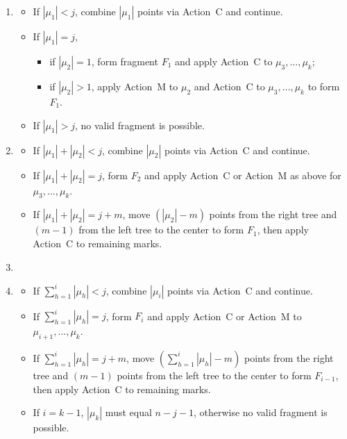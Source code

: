 \documentclass[11pt,reqno]{amsart}
\theoremstyle{definition}
\begin{document}
\begin{enumerate}
\item[$\boldsymbol{\mu_1:}$]
\begin{itemize}
    \item If $|\mu_1| < j$, combine $|\mu_1|$ points via Action~C and continue.
    \item If $|\mu_1| = j$, 
    \begin{itemize}
        \item if $|\mu_2| = 1$, form fragment $F_1$ and apply Action~C to $\mu_3,\dots,\mu_k$;
        \item if $|\mu_2| > 1$, apply Action~M to $\mu_2$ and Action~C to $\mu_3,\dots,\mu_k$ to form $F_1$.
    \end{itemize}
    \item If $|\mu_1| > j$, no valid fragment is possible.
\end{itemize}

\item[$\boldsymbol{\mu_2:}$]
\begin{itemize}
    \item If $|\mu_1|+|\mu_2| < j$, combine $|\mu_2|$ points via Action~C and continue.
    \item If $|\mu_1|+|\mu_2| = j$, form $F_2$ and apply Action~C or Action~M as above for $\mu_3,\dots,\mu_k$.
    \item If $|\mu_1|+|\mu_2| = j + m$, move $(|\mu_2|-m)$ points from the right tree and $(m-1)$ from the left tree to the center to form $F_1$, then apply Action~C to remaining marks.
\end{itemize}

\item[\vdots]

\item[$\boldsymbol{\mu_i:}$]
\begin{itemize}
    \item If $\sum_{h=1}^i |\mu_h| < j$, combine $|\mu_i|$ points via Action~C and continue.
    \item If $\sum_{h=1}^i |\mu_h| = j$, form $F_i$ and apply Action~C or Action~M to $\mu_{i+1},\dots,\mu_k$.
    \item If $\sum_{h=1}^i |\mu_h| = j + m$, move $(\sum_{h=1}^i |\mu_h| - m)$ points from the right tree and $(m-1)$ points from the left tree to the center to form $F_{i-1}$, then apply Action~C to remaining marks.
    \item If $i=k-1$, $|\mu_k|$ must equal $n-j-1$, otherwise no valid fragment is possible.
\end{itemize}
\end{enumerate}
\end{document}
